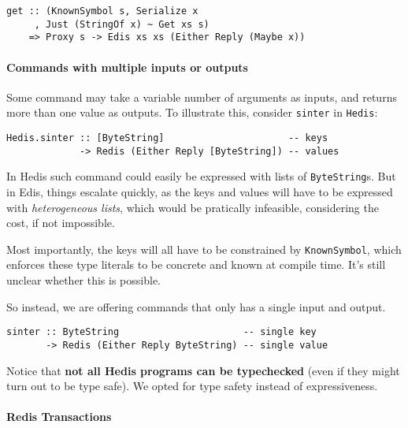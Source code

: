 \documentclass[pldi]{sigplanconf-pldi16}
\begin{document}
\begin{verbatim}
get :: (KnownSymbol s, Serialize x
     , Just (StringOf x) ~ Get xs s)
    => Proxy s -> Edis xs xs (Either Reply (Maybe x))
\end{verbatim}

\paragraph{Commands with multiple inputs or outputs}

Some command may take a variable number of arguments as inputs, and returns more
 than one value as outputs. To illustrate this, consider
 \texttt{sinter} in \texttt{Hedis}:

\begin{verbatim}
Hedis.sinter :: [ByteString]                      -- keys
             -> Redis (Either Reply [ByteString]) -- values
\end{verbatim}

In Hedis such command could easily be expressed with lists of
 \texttt{ByteString}s. But in Edis, things escalate quickly, as
 the keys and values will have to be expressed with \emph{heterogeneous
 lists}\cite{hetero}, which would be pratically infeasible, considering the cost,
 if not impossible.

Most importantly, the keys will all have to be constrained by
 \texttt{KnownSymbol}, which enforces these type literals to be
 concrete and known at compile time.
 It's still unclear whether this is possible.

So instead, we are offering commands that only has a single input and output.

\begin{verbatim}
sinter :: ByteString                      -- single key
       -> Redis (Either Reply ByteString) -- single value
\end{verbatim}

Notice that \textbf{not all Hedis programs can be typechecked} (even if they
 might turn out to be type safe). We opted for type safety instead of
 expressiveness.

\paragraph{Redis Transactions}
\end{document}
